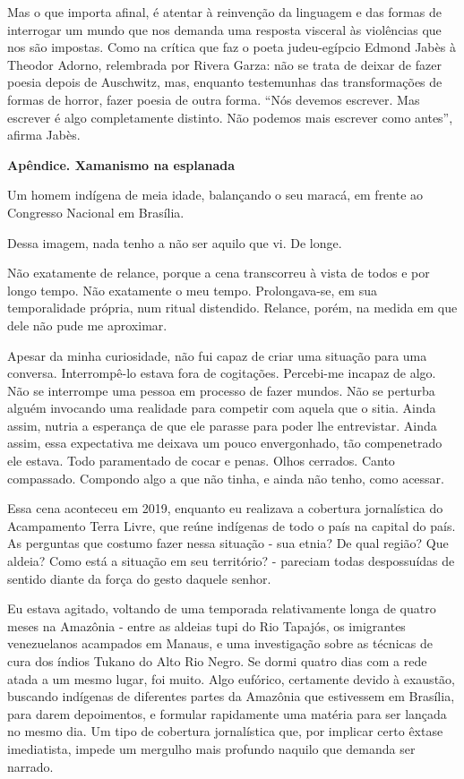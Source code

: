 Mas o que importa afinal, é atentar à reinvenção da linguagem e das
formas de interrogar um mundo que nos demanda uma resposta visceral às
violências que nos são impostas. Como na crítica que faz o poeta
judeu-egípcio Edmond Jabès à Theodor Adorno, relembrada por Rivera
Garza: não se trata de deixar de fazer poesia depois de Auschwitz, mas,
enquanto testemunhas das transformações de formas de horror, fazer
poesia de outra forma. ``Nós devemos escrever. Mas escrever é algo
completamente distinto. Não podemos mais escrever como antes'', afirma
Jabès.

\textbf{Apêndice. Xamanismo na esplanada}

Um homem indígena de meia idade, balançando o seu maracá, em frente ao
Congresso Nacional em Brasília.

Dessa imagem, nada tenho a não ser aquilo que vi. De longe.

Não exatamente de relance, porque a cena transcorreu à vista de todos e
por longo tempo. Não exatamente o meu tempo. Prolongava-se, em sua
temporalidade própria, num ritual distendido. Relance, porém, na medida
em que dele não pude me aproximar.

Apesar da minha curiosidade, não fui capaz de criar uma situação para
uma conversa. Interrompê-lo estava fora de cogitações. Percebi-me
incapaz de algo. Não se interrompe uma pessoa em processo de fazer
mundos. Não se perturba alguém invocando uma realidade para competir com
aquela que o sitia. Ainda assim, nutria a esperança de que ele parasse
para poder lhe entrevistar. Ainda assim, essa expectativa me deixava um
pouco envergonhado, tão compenetrado ele estava. Todo paramentado de
cocar e penas. Olhos cerrados. Canto compassado. Compondo algo a que não
tinha, e ainda não tenho, como acessar.

Essa cena aconteceu em 2019, enquanto eu realizava a cobertura
jornalística do Acampamento Terra Livre, que reúne indígenas de todo o
país na capital do país. As perguntas que costumo fazer nessa situação -
sua etnia? De qual região? Que aldeia? Como está a situação em seu
território? - pareciam todas despossuídas de sentido diante da força do
gesto daquele senhor.

Eu estava agitado, voltando de uma temporada relativamente longa de
quatro meses na Amazônia - entre as aldeias tupi do Rio Tapajós, os
imigrantes venezuelanos acampados em Manaus, e uma investigação sobre as
técnicas de cura dos índios Tukano do Alto Rio Negro. Se dormi quatro
dias com a rede atada a um mesmo lugar, foi muito. Algo eufórico,
certamente devido à exaustão, buscando indígenas de diferentes partes da
Amazônia que estivessem em Brasília, para darem depoimentos, e formular
rapidamente uma matéria para ser lançada no mesmo dia. Um tipo de
cobertura jornalística que, por implicar certo êxtase imediatista,
impede um mergulho mais profundo naquilo que demanda ser narrado.

